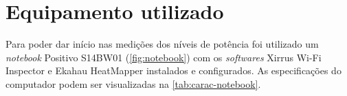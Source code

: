 \begin{figure}[H]
	\centering
\end{figure}

\section{Equipamento utilizado}
\label{equipamento-utilizado}

Para poder dar início nas medições dos níveis de potência foi utilizado um \textit{notebook} Positivo S14BW01 (\autoref{fig:notebook}) com os \textit{softwares} Xirrus Wi-Fi Inspector e Ekahau HeatMapper instalados e configurados. As especificações do computador podem ser visualizadas na \autoref{tab:carac-notebook}.

\begin{figure}[H]
	\centering
\end{figure}

